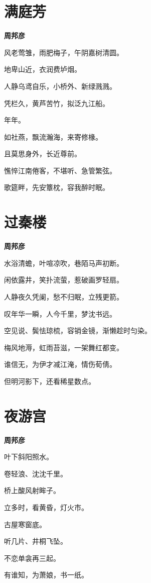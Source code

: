 \documentclass[12pt,a4paper]{ctexbook}
\begin{document}
\section{满庭芳}
\textbf{周邦彦}\par\vspace{0.5em}
风老莺雏，雨肥梅子，午阴嘉树清圆。\par
地卑山近，衣润费垆烟。\par
人静乌鸢自乐，小桥外、新绿溅溅。\par
凭栏久，黄芦苦竹，拟泛九江船。\par
年年。\par
如社燕，飘流瀚海，来寄修椽。\par
且莫思身外，长近尊前。\par
憔悴江南倦客，不堪听、急管繁弦。\par
歌筵畔，先安簟枕，容我醉时眠。\par

\section{过秦楼}
\textbf{周邦彦}\par\vspace{0.5em}
水浴清蟾，叶喧凉吹，巷陌马声初断。\par
闲依露井，笑扑流萤，惹破画罗轻扇。\par
人静夜久凭阑，愁不归眠，立残更箭。\par
叹年华一瞬，人今千里，梦沈书远。\par
空见说、鬓怯琼梳，容销金镜，渐懒趁时匀染。\par
梅风地溽，虹雨苔滋，一架舞红都变。\par
谁信无，为伊才减江淹，情伤荀倩。\par
但明河影下，还看稀星数点。\par

\section{夜游宫}
\textbf{周邦彦}\par\vspace{0.5em}
叶下斜阳照水。\par
卷轻浪、沈沈千里。\par
桥上酸风射眸子。\par
立多时，看黄昏，灯火市。\par
古屋寒窗底。\par
听几片、井桐飞坠。\par
不恋单衾再三起。\par
有谁知，为萧娘，书一纸。\par
\end{document}
